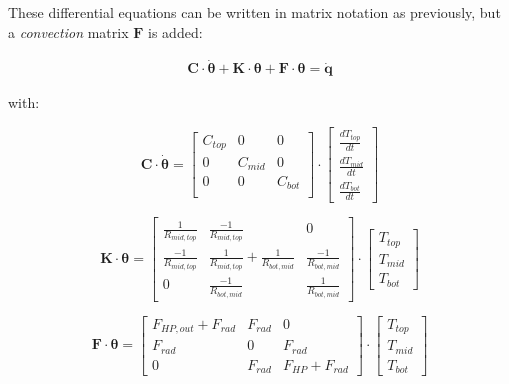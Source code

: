 These differential equations can be written in matrix notation as previously, but a \emph{convection} matrix $\mathbf{F}$ is added:

\begin{subequations}
	\label{eq:matnot}
	\begin{align}
		\mathbf{C} \cdot \boldsymbol{\dot{\theta}} + \mathbf{K} \cdot \boldsymbol{\theta} + \mathbf{F} \cdot \boldsymbol{\theta}= \mathbf{\dot{q}}
	\end{align}
\end{subequations}

with:

\begin{equation}
	\mathbf{C} \cdot \boldsymbol{\dot{\theta}} =
	\begin{bmatrix}
		C_{top} & 0 & 0 \\
		0 &  C_{mid} & 0 \\
		0 & 0 & C_{bot} \\
	\end{bmatrix}
	\cdot
	\begin{bmatrix}
		\frac{dT_{top}}{dt} \\
		\frac{dT_{mid}}{dt} \\
		\frac{dT_{bot}}{dt}
	\end{bmatrix}
\end{equation}

\begin{equation}
	\mathbf{K} \cdot \boldsymbol{\theta} =
	\begin{bmatrix}
		\frac{1}{R_{mid,top}} & \frac{-1}{R_{mid,top}} & 0\\
		\frac{-1}{R_{mid,top}} &  \frac{1}{R_{mid, top}} + \frac{1}{R_{bot,mid}} & \frac{-1}{R_{bot,mid}}\\
		0 &  \frac{-1}{R_{bot, mid}} & \frac{1}{R_{bot,mid}}
	\end{bmatrix}
	\cdot
	\begin{bmatrix}
		T_{top} \\
		T_{mid} \\
		T_{bot}
	\end{bmatrix}
\end{equation}

\begin{equation}
	\mathbf{F} \cdot \boldsymbol{\theta} =
	\begin{bmatrix}
		F_{HP,out} + F_{rad} & F_{rad} & 0 \\
		F_{rad} &  0  & F_{rad} \\
		0 &  F_{rad} & F_{HP} + F_{rad}
	\end{bmatrix}
	\cdot
	\begin{bmatrix}
		T_{top} \\
		T_{mid} \\
		T_{bot}
	\end{bmatrix}
\end{equation}

